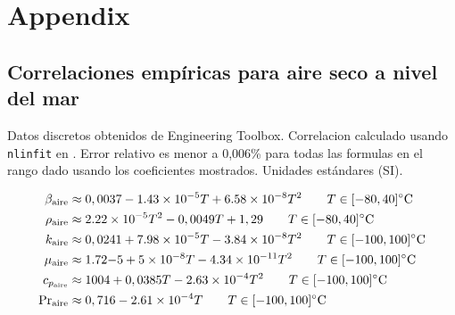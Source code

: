 \newcommand{\air}{\textrm{aire}}
\onecolumn
\section{Appendix}
\subsection{Correlaciones empíricas para aire seco a nivel del mar}
Datos discretos obtenidos de Engineering Toolbox. Correlacion calculado usando \verb|nlinfit| en \Matlab. Error relativo es menor a 0,006\% para todas las formulas en el rango dado usando los coeficientes mostrados. Unidades estándares (SI).


\begin{align}
\beta_\air &\approx 0,0037-\num{1,43e-5}T+\num{6,58e-8}T^2 \qquad T\in [-80,40]\celsius \\
\rho_\air &\approx  \num{2,22e-5}T^2-0,0049T+1,29\qquad T\in [-80,40]\celsius \\
k_\air &\approx 0,0241 + \num{7.98e-5}T-\num{3,84e-8}T^2 \qquad T\in [-100,100]\celsius \\
\mu_\air &\approx \num{1,72}{-5} +\num{5e-8}T-\num{4,34e-11}T^2\qquad T\in [-100,100]\celsius \\
c_{p_\air} &\approx 1004 + 0,0385T-\num{2,63e-4}T^2 \qquad T\in [-100,100]\celsius \\
\Prandtl_\air &\approx 0,716 -\num{2,61e-4}T  \qquad T\in [-100,100]\celsius
\end{align}
